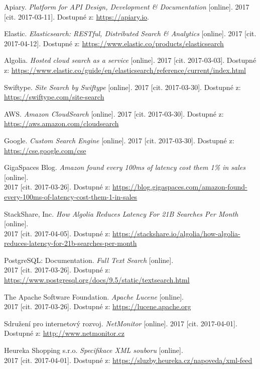 \documentclass[FM,DP]{tulthesis}
\begin{document}
\begin{thebibliography}{Mm99}

 Apiary. \emph{Platform for API Design, Development \& Documentation} [online].
2017 [cit. 2017-03-11]. Dostupné z: \url{https://apiary.io}.

 Elastic. \emph{ Elasticsearch: RESTful, Distributed Search \& Analytics} [online].
2017 [cit. 2017-04-12]. Dostupné z: \url{https://www.elastic.co/products/elasticsearch}

 Algolia. \emph{Hosted cloud search as a service} [online].
2017 [cit. 2017-03-03]. Dostupné z:
\url{https://www.elastic.co/guide/en/elasticsearch/reference/current/index.html}

 Swiftype. \emph{Site Search by Swiftype} [online].
2017 [cit. 2017-03-30]. Dostupné z: \url{https://swiftype.com/site-search}

 AWS. \emph{Amazon CloudSearch} [online].
2017 [cit. 2017-03-30]. Dostupné z: \url{https://aws.amazon.com/cloudsearch}

 Google. \emph{Custom Search Engine} [online].
2017 [cit. 2017-03-30]. Dostupné z: \url{https://cse.google.com/cse}

 GigaSpaces Blog.
\emph{Amazon found every 100ms of latency cost them 1\% in sales} [online]. \\
2017 [cit. 2017-03-26].
Dostupné z: \url{https://blog.gigaspaces.com/amazon-found-every-100ms-of-latency-cost-them-1-in-sales}

 StackShare, Inc. 
\emph{How Algolia Reduces Latency For 21B Searches Per Month} [online].\\
2017 [cit. 2017-04-05]. Dostupné z:
\url{https://stackshare.io/algolia/how-algolia-reduces-latency-for-21b-searches-per-month}

 PostgreSQL: Documentation. \emph{Full Text Search} [online].\\
2017 [cit. 2017-03-26]. Dostupné z: \url{https://www.postgresql.org/docs/9.5/static/textsearch.html}

 The Apache Software Foundation. \emph{Apache Lucene} [online].\\
2017 [cit. 2017-03-26]. Dostupné z: \url{https://lucene.apache.org}

 Sdružení pro internetový rozvoj. \emph{NetMonitor} [online].
2017 [cit. 2017-04-01]. Dostupné z: \url{http://www.netmonitor.cz}

 Heureka Shopping s.r.o. \emph{Specifikace XML souboru} [online].\\
2017 [cit. 2017-04-01]. Dostupné z: \url{https://sluzby.heureka.cz/napoveda/xml-feed}


\end{thebibliography}
\end{document}
